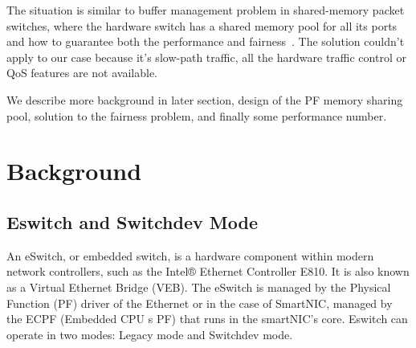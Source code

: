 \documentclass[letterpaper]{article}
\begin{document}
The situation is similar to buffer management problem in shared-memory
packet switches, where the hardware switch has a shared memory pool
for all its ports and how to guarantee both the performance and
fairness~\cite{devlinksb}. The solution couldn't apply to
our case because it's slow-path traffic, all the hardware traffic
control or QoS features are not available.

We describe more background in later section, design of the PF memory
sharing pool, solution to the fairness problem, and finally some performance
number.

\section{Background}

\subsection{Eswitch and Switchdev Mode}
An eSwitch, or embedded switch, is a hardware component within modern network
controllers, such as the Intel® Ethernet Controller E810. It is also known as
a Virtual Ethernet Bridge (VEB). The eSwitch is managed by the Physical Function (PF)
driver of the Ethernet or in the case of SmartNIC, managed by the ECPF (Embedded CPU
s PF) that runs in the smartNIC's core. Eswitch can operate in two modes:
Legacy mode and Switchdev mode. 
\end{document}
